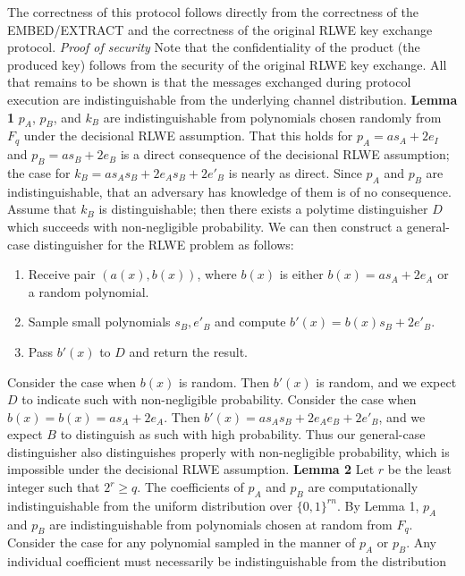 \documentclass{article}
\begin{document}
\noindent The correctness of this protocol follows directly from the correctness of 
the EMBED/EXTRACT and the correctness of the original RLWE key exchange protocol.
\newline\newline
\noindent \textit{Proof of security } Note that the confidentiality of the product (the produced key) 
follows from the security of the original RLWE key exchange.  All that remains to be shown is that 
the messages exchanged during protocol execution are indistinguishable from the underlying channel distribution.
\newline\newline
\noindent \textbf{Lemma 1 } $p_A$, $p_B$, and $k_B$ are indistinguishable from polynomials chosen 
randomly from $F_q$ under the decisional RLWE assumption.
\newline\newline
That this holds for $p_A = as_A + 2e_I$ and $p_B = as_B + 2e_B$ is a direct consequence of the 
decisional RLWE assumption; the case for $k_B = as_As_B + 2e_As_B + 2e'_B$ is nearly as direct.
Since $p_A$ and $p_B$ are indistinguishable, that an adversary has knowledge of them is of no consequence.
Assume that $k_B$ is distinguishable; then there exists a polytime distinguisher $D$ which succeeds with 
non-negligible probability.  We can then construct a general-case distinguisher for the RLWE 
problem as follows:

\begin{enumerate}
\item{Receive pair $(a(x), b(x))$, where $b(x)$ is either $b(x) = as_A + 2e_A$ or a random polynomial.}
\item{Sample small polynomials $s_B, e'_B$ and compute $b'(x) = b(x)s_B + 2e'_B$.}
\item{Pass $b'(x)$ to $D$ and return the result.}
\end{enumerate}

\noindent Consider the case when $b(x)$ is random.  Then $b'(x)$ is random, and we expect 
$D$ to indicate such with non-negligible probability.  Consider the case when $b(x) = b(x) = as_A + 2e_A$.
Then $b'(x) = as_As_B + 2e_Ae_B + 2e'_B$, and we expect $B$ to distinguish as such with high probability.
Thus our general-case distinguisher also distinguishes properly with non-negligible probability, which is 
impossible under the decisional RLWE assumption.
\newline\newline
\noindent \textbf{Lemma 2 } Let $r$ be the least integer such that $2^r \geq q$.  
The coefficients of $p_A$ and $p_B$ are computationally indistinguishable 
from the uniform distribution over $\{0,1\}^{r n}$.
\newline\newline
By Lemma 1, $p_A$ and $p_B$ are indistinguishable from polynomials chosen at random from $F_q$.  
Consider the case for any polynomial sampled in the manner of $p_A$ or $p_B$.  Any 
individual coefficient must necessarily be indistinguishable from the distribution
\end{document}
